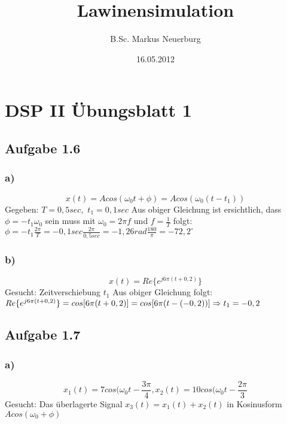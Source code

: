 \documentclass[12pt]{scrreprt}
\title{Lawinensimulation}
\author{B.Sc. Markus Neuerburg}
\date{16.05.2012}
\begin{document}
\setlength{\topmargin}{0cm}
\parindent 0pt
\section*{DSP II Übungsblatt 1}
\subsection*{Aufgabe 1.6}
\subsubsection*{a)}
\begin{equation}
	x(t)=A cos(\omega_0 t + \phi) = A cos(\omega_0(t-t_1))
\end{equation}
Gegeben:\newline
$T=0,5 sec,$\newline
$t_1=0,1 sec$\newline
Aus obiger Gleichung ist ersichtlich, dass $\phi=-t_1 \omega_0$ sein muss mit $\omega_0= 2 \pi f$ und $f=\frac{1}{T}$ folgt: $\phi=-t_1 \frac{2 \pi}{T} = -0,1sec \frac{2 \pi}{0,5sec} = -1,26 rad  \frac{180}{\pi} = -72,2^\circ$
\subsubsection*{b)}
\begin{equation}
	x(t)=Re \lbrace e^{j 6 \pi (t + 0,2)} \rbrace
\end{equation}
Gesucht:\newline
Zeitverschiebung $t_1$\newline
Aus obiger Gleichung folgt: $Re \lbrace e^{j 6 \pi (t + 0,2)} \rbrace = cos[6\pi(t + 0,2)] = cos[6\pi(t - (-0,2))] \newline \Rightarrow t_1 = -0,2$
\subsection*{Aufgabe 1.7}
\subsubsection*{a)}
\begin{equation}
	x_1(t)=7cos(\omega_0 t - \frac{3\pi}{4}, x_2(t)=10cos(\omega_0 t - \frac{2\pi}{3}
\end{equation}
Gesucht: \newline
Das überlagerte Signal $x_3(t) = x_1(t) + x_2(t)$ in Kosinusform $Acos(\omega_0 + \phi)$
\end{document}
